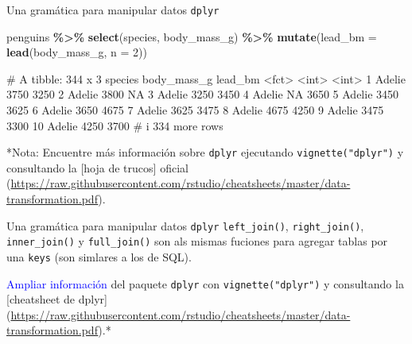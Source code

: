 \documentclass[
  ignorenonframetext,
  aspectratio=169]{beamer}
\newenvironment{Shaded}{\begin{snugshade}}{\end{snugshade}}
\newcommand{\AttributeTok}[1]{\textcolor[rgb]{0.13,0.29,0.53}{#1}}
\newcommand{\DecValTok}[1]{\textcolor[rgb]{0.00,0.00,0.81}{#1}}
\newcommand{\FunctionTok}[1]{\textcolor[rgb]{0.13,0.29,0.53}{\textbf{#1}}}
\newcommand{\NormalTok}[1]{#1}
\newcommand{\SpecialCharTok}[1]{\textcolor[rgb]{0.81,0.36,0.00}{\textbf{#1}}}
\let\oldverbatim\verbatim
\let\endoldverbatim\endverbatim
\renewenvironment{verbatim}{\tiny\oldverbatim}{\endoldverbatim}
\newcommand\blue[1]{\textcolor{blue}{#1}}
\begin{document}
\begin{frame}[fragile]{Una gramática para manipular datos
\texttt{dplyr}}
\begin{Shaded}
\begin{Highlighting}[]
\NormalTok{penguins }\SpecialCharTok{\%\textgreater{}\%} \FunctionTok{select}\NormalTok{(species, body\_mass\_g) }\SpecialCharTok{\%\textgreater{}\%} 
  \FunctionTok{mutate}\NormalTok{(}\AttributeTok{lead\_bm =} \FunctionTok{lead}\NormalTok{(body\_mass\_g, }\AttributeTok{n =} \DecValTok{2}\NormalTok{))}
\end{Highlighting}
\end{Shaded}

\begin{verbatim}
# A tibble: 344 x 3
   species body_mass_g lead_bm
   <fct>         <int>   <int>
 1 Adelie         3750    3250
 2 Adelie         3800      NA
 3 Adelie         3250    3450
 4 Adelie           NA    3650
 5 Adelie         3450    3625
 6 Adelie         3650    4675
 7 Adelie         3625    3475
 8 Adelie         4675    4250
 9 Adelie         3475    3300
10 Adelie         4250    3700
# i 334 more rows
\end{verbatim}

*Nota: Encuentre más información sobre \texttt{dplyr} ejecutando
\texttt{vignette("dplyr")} y consultando la {[}hoja de trucos{]} oficial
(\url{https://raw.githubusercontent.com/rstudio/cheatsheets/master/data-transformation.pdf}).
\end{frame}

\begin{frame}[fragile]{Una gramática para manipular datos
\texttt{dplyr}}
\label{una-gramuxe1tica-para-manipular-datos-dplyr-19}
\texttt{left\_join()}, \texttt{right\_join()}, \texttt{inner\_join()} y
\texttt{full\_join()} son als mismas fuciones para agregar tablas por
una \texttt{keys} (son simlares a los de SQL).

\blue{Ampliar información} del paquete \texttt{dplyr} con
\texttt{vignette("dplyr")} y consultando la {[}cheatsheet de dplyr{]}
(\url{https://raw.githubusercontent.com/rstudio/cheatsheets/master/data-transformation.pdf}).*
\end{frame}
\end{document}
